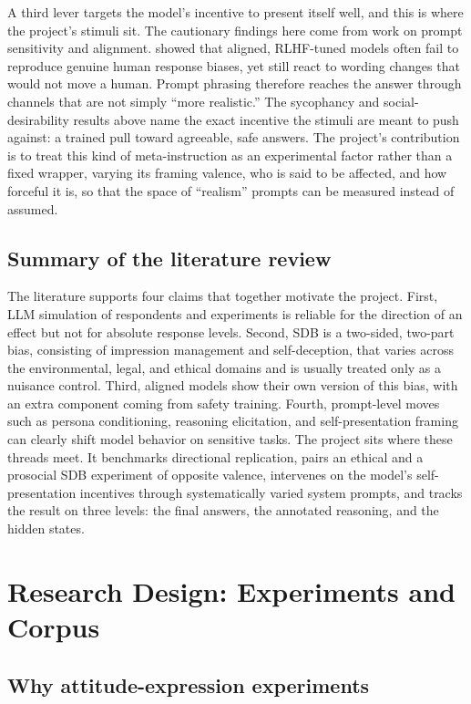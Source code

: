 \documentclass[14pt,a4paper]{extarticle}
\let\cite\squarecite
\begin{document}
A third lever targets the model's incentive to present itself well, and this is where the project's stimuli sit. The cautionary findings here come from work on prompt sensitivity and alignment. \textcite{tjuatja2024} showed that aligned, RLHF-tuned models often fail to reproduce genuine human response biases, yet still react to wording changes that would not move a human. Prompt phrasing therefore reaches the answer through channels that are not simply ``more realistic.'' The sycophancy and social-desirability results above \cite{sharma2023,salecha2024} name the exact incentive the stimuli are meant to push against: a trained pull toward agreeable, safe answers. The project's contribution is to treat this kind of meta-instruction as an experimental factor rather than a fixed wrapper, varying its framing valence, who is said to be affected, and how forceful it is, so that the space of ``realism'' prompts can be measured instead of assumed.

\subsection*{Summary of the literature review}

The literature supports four claims that together motivate the project. First, LLM simulation of respondents and experiments is reliable for the direction of an effect but not for absolute response levels. Second, SDB is a two-sided, two-part bias, consisting of impression management and self-deception, that varies across the environmental, legal, and ethical domains and is usually treated only as a nuisance control. Third, aligned models show their own version of this bias, with an extra component coming from safety training. Fourth, prompt-level moves such as persona conditioning, reasoning elicitation, and self-presentation framing can clearly shift model behavior on sensitive tasks. The project sits where these threads meet. It benchmarks directional replication, pairs an ethical and a prosocial SDB experiment of opposite valence, intervenes on the model's self-presentation incentives through systematically varied system prompts, and tracks the result on three levels: the final answers, the annotated reasoning, and the hidden states.

\section{Research Design: Experiments and Corpus}

\subsection{Why attitude-expression experiments}
\end{document}
